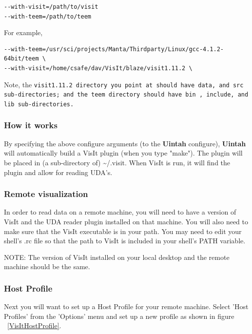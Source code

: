 \documentclass[12pt]{article}
\begin{document}
\begin{verbatim}
--with-visit=/path/to/visit 
--with-teem=/path/to/teem
\end{verbatim}

For example,

\begin{verbatim}
--with-teem=/usr/sci/projects/Manta/Thirdparty/Linux/gcc-4.1.2-64bit/teem \
--with-visit=/home/csafe/dav/VisIt/blaze/visit1.11.2 \
\end{verbatim}

Note, the \tt visit1.11.2 \normalfont directory you point at should
have \tt data\normalfont , and \tt src \normalfont sub-directories;
and the \tt teem \normalfont directory should have \tt bin\normalfont
, \tt include\normalfont , and \tt lib \normalfont sub-directories.

\subsubsection{How it works}
By specifying the above configure arguments (to the \textbf{Uintah}
configure), \textbf{Uintah} will automatically build a VisIt plugin
(when you type "make"). The plugin will be placed in (a sub-directory
of) \textasciitilde/.visit. When VisIt is run, it will find the plugin
and allow for reading UDA's.

\subsubsection{Remote visualization}
In order to read data on a remote machine, you will need to have a
version of VisIt and the UDA reader plugin installed on that
machine. You will also need to make sure that the VisIt executable is
in your path. You may need to edit your shell's .rc file so that the
path to VisIt is included in your shell's PATH variable.

NOTE: The version of VisIt installed on your local desktop and the
remote machine should be the same.

\subsubsection{Host Profile}
Next you will want to set up a Host Profile for your remote
machine. Select 'Host Profiles' from the 'Options' menu and set up a
new profile as shown in figure ~\ref{VisItHostProfile}.
\end{document}
